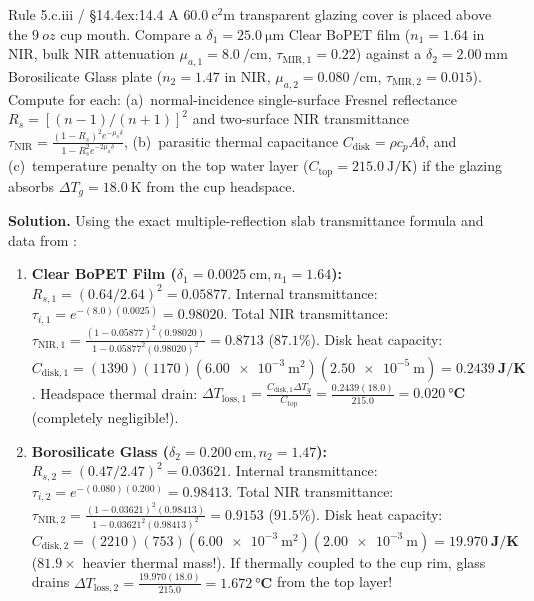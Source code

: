 \begin{workedexample}{Rule 5.c.iii / §14.4}{ex:14.4}
A $\SI{60.0}{\square\centi\meter}$ transparent glazing cover is placed above the $\SI{9}{oz}$ cup mouth. Compare a $\delta_1 = \SI{25.0}{\micro\meter}$ Clear BoPET film ($n_1 = 1.64$ in NIR, bulk NIR attenuation $\mu_{a,1} = \SI{8.0}{\per\centi\meter}$, $\tau_{\mathrm{MIR},1} = 0.22$) against a $\delta_2 = \SI{2.00}{\milli\meter}$ Borosilicate Glass plate ($n_2 = 1.47$ in NIR, $\mu_{a,2} = \SI{0.080}{\per\centi\meter}$, $\tau_{\mathrm{MIR},2} = 0.015$). Compute for each: (a)~normal-incidence single-surface Fresnel reflectance $R_s = [(n-1)/(n+1)]^2$ and two-surface NIR transmittance $\tau_{\mathrm{NIR}} = \frac{(1-R_s)^2 e^{-\mu_a\delta}}{1 - R_s^2 e^{-2\mu_a\delta}}$, (b)~parasitic thermal capacitance $C_{\mathrm{disk}} = \rho c_p A\delta$, and (c)~temperature penalty on the top water layer ($C_{\mathrm{top}} = \SI{215.0}{\joule\per\kelvin}$) if the glazing absorbs $\Delta T_g = \SI{18.0}{\kelvin}$ from the cup headspace.

\textbf{Solution.} Using the exact multiple-reflection slab transmittance formula and data from :
\begin{enumerate}
  \item \textbf{Clear BoPET Film ($\delta_1 = \SI{0.0025}{\centi\meter}, n_1 = 1.64$):} $R_{s,1} = (0.64/2.64)^2 = 0.05877$. Internal transmittance: $\tau_{i,1} = e^{-(8.0)(0.0025)} = 0.98020$. Total NIR transmittance: $\tau_{\mathrm{NIR},1} = \frac{(1-0.05877)^2(0.98020)}{1 - 0.05877^2(0.98020)^2} = \mathbf{0.8713}$ ($87.1\%$). Disk heat capacity: $C_{\mathrm{disk},1} = (1390)(1170)(\SI{6.00e-3}{\square\meter})(\SI{2.50e-5}{\meter}) = \mathbf{\SI{0.2439}{\joule\per\kelvin}}$. Headspace thermal drain: $\Delta T_{\mathrm{loss},1} = \frac{C_{\mathrm{disk},1}\Delta T_g}{C_{\mathrm{top}}} = \frac{0.2439(18.0)}{215.0} = \mathbf{\SI{0.020}{\celsius}}$ (completely negligible!).
  \item \textbf{Borosilicate Glass ($\delta_2 = \SI{0.200}{\centi\meter}, n_2 = 1.47$):} $R_{s,2} = (0.47/2.47)^2 = 0.03621$. Internal transmittance: $\tau_{i,2} = e^{-(0.080)(0.200)} = 0.98413$. Total NIR transmittance: $\tau_{\mathrm{NIR},2} = \frac{(1-0.03621)^2(0.98413)}{1 - 0.03621^2(0.98413)^2} = \mathbf{0.9153}$ ($91.5\%$). Disk heat capacity: $C_{\mathrm{disk},2} = (2210)(753)(\SI{6.00e-3}{\square\meter})(\SI{2.00e-3}{\meter}) = \mathbf{\SI{19.970}{\joule\per\kelvin}}$ ($81.9\times$ heavier thermal mass!). If thermally coupled to the cup rim, glass drains $\Delta T_{\mathrm{loss},2} = \frac{19.970(18.0)}{215.0} = \mathbf{\SI{1.672}{\celsius}}$ from the top layer!
\end{enumerate}
\end{workedexample}

